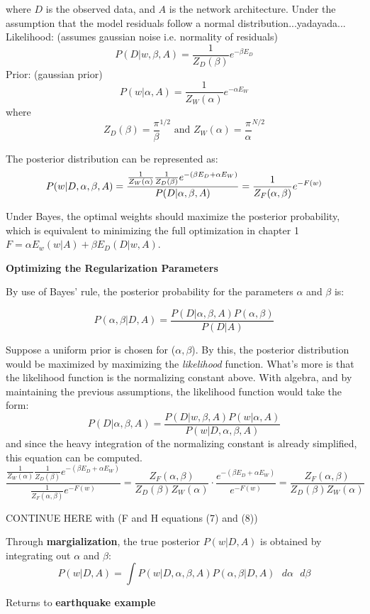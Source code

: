 where $D$ is the observed data, and $A$ is the network architecture. Under the assumption that the model residuals follow a normal distribution...yadayada...
Likelihood: (assumes gaussian noise i.e. normality of residuals)
$$
P(D|w,\beta,A) = \frac{1}{Z_D(\beta)} e^{-\beta E_D}
$$
Prior: (gaussian prior)
$$
P(w|\alpha,A) = \frac{1}{Z_W(\alpha)} e^{-\alpha E_W}
$$
where
$$
Z_D(\beta) = \frac{\pi}{\beta}^{1/2} \text{ and }
Z_W(\alpha) = \frac{\pi}{\alpha}^{N/2}
$$

The posterior distribution can be represented as:
$$
P(w|D,\alpha,\beta,A) = \frac{\frac{1}{Z_W(\alpha)} \frac{1}{Z_D(\beta)} e^{-(\beta E_D + \alpha E_W)}}{P(D|\alpha,\beta,A)} \\
= \frac{1}{Z_F(\alpha,\beta)} e^{-F(w)}
$$

Under Bayes, the optimal weights should maximize the posterior probability, which is equivalent to minimizing the full optimization in chapter 1 $F = \alpha E_w(w|A) + \beta E_D(D|w,A)$.


\textbf{Optimizing the Regularization Parameters}

By use of Bayes' rule, the posterior probability for the parameters $\alpha$ and $\beta$ is:

$$
P(\alpha, \beta | D,A) = \frac{P(D|\alpha,\beta,A) P(\alpha,\beta)}{P(D|A)}
$$



Suppose a uniform prior is chosen for ($\alpha,\beta$).  By this, the posterior distribution would be maximized by maximizing the \textit{likelihood} function.  What's more is that the likelihood function is the normalizing constant above.  With algebra, and by maintaining the previous assumptions, the likelihood function would take the form:
$$
P(D|\alpha,\beta,A) = \frac{P(D|w,\beta,A) P(w|\alpha,A)}{P(w|D,\alpha,\beta,A)}
$$
and since the heavy integration of the normalizing constant is already simplified, this equation can be computed.
$$
\frac{\frac{1}{Z_W(\alpha)} \frac{1}{Z_D(\beta)} e^{-(\beta E_D + \alpha E_W)}}{\frac{1}{Z_F(\alpha,\beta)} e^{-F(w)}} = \frac{Z_F(\alpha,\beta)}{Z_D(\beta) Z_W(\alpha)} \cdot \frac{e^{-(\beta E_D + \alpha E_W)}}{e^{-F(w)}} = \frac{Z_F(\alpha,\beta)}{Z_D(\beta) Z_W(\alpha)}
$$

CONTINUE HERE with (F and H equations (7) and (8)) 

Through \textbf{margialization}, the true posterior $P(w|D,A)$ is obtained by integrating out $\alpha$ and $\beta$:
$$
P(w|D,A) = \int P(w|D,\alpha,\beta,A) P(\alpha, \beta | D,A) \text{ } d\alpha \text{ } d\beta
$$


Returns to \textbf{earthquake example}
